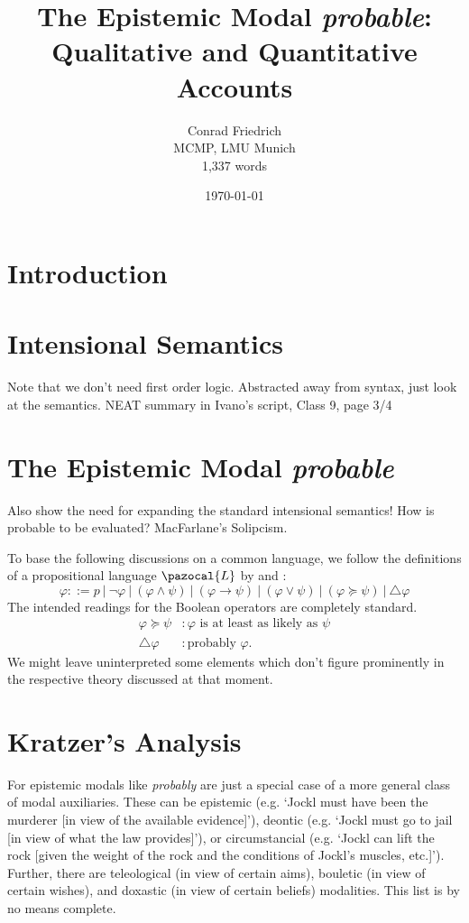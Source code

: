 \documentclass{article}
\title{The Epistemic Modal \emph{probable}: Qualitative and Quantitative Accounts}
\author{Conrad Friedrich \\ MCMP, LMU Munich \\ 1,337 words}
\date{\today}
\theoremstyle{definition}
\renewcommand{\L}{\pazocal{L}}
\begin{document}
\onehalfspacing
\maketitle

\section{Introduction}



\section{Intensional Semantics}
Note that we don't need first order logic. 
Abstracted away from syntax, just look at the semantics.
NEAT summary in Ivano's script, Class 9, page 3/4
\section{The Epistemic Modal \emph{probable}}
Also show the need for expanding the standard intensional semantics!
How is probable to be evaluated? MacFarlane's Solipcism. 

To base the following discussions on a common language, we follow the definitions of a propositional language $\L$ by \textcite{harrison-trainor17_prefer} and \textcite{holliday13_measur}:
\[
\varphi ::= p ~|~ \neg \varphi ~|~ (\varphi \land \psi) ~|~ (\varphi \rightarrow \psi) ~|~ (\varphi \vee \psi) ~|~ (\varphi \succeq \psi) ~|~ \triangle\varphi 
\]
The intended readings for the Boolean operators are completely standard.
\begin{align*}
  \varphi \succeq \psi &: \varphi \text{ is at least as likely as } \psi \\
  \triangle \varphi &:\text{probably } \varphi.
\end{align*}
We might leave uninterpreted some elements which don't figure prominently in the respective theory discussed at that moment.

\section{Kratzer's Analysis}

For \textcite{kratzer91_modal} epistemic modals like \emph{probably} are just a special case of a more general class of modal auxiliaries.
These can be epistemic (e.g. `Jockl must have been the murderer [in view of the available evidence]'), deontic (e.g. `Jockl must go to jail [in view of what the law provides]'), or circumstancial (e.g. `Jockl can lift the rock [given the weight of the rock and the conditions of Jockl's muscles, etc.]').
Further, there are teleological (in view of certain aims), bouletic (in view of certain wishes), and doxastic (in view of certain beliefs) modalities.
This list is by no means complete.
\end{document}

